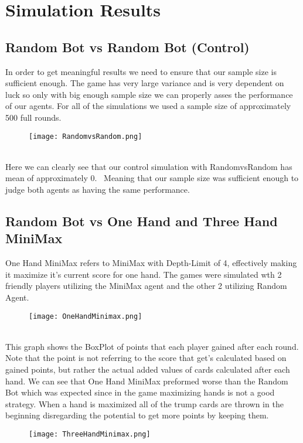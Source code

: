 \section{Simulation Results}\label{SimulationResults}
\subsection{Random Bot vs Random Bot (Control)}
In order to get meaningful results we need to ensure that our sample size is sufficient enough. 
The game has very large variance and is very dependent on luck so only with big enough sample size we can properly asses the performance of our agents.
For all of the simulations we used a sample size of approximately 500 full rounds. 
\begin{figure}[h]
    \centering
    \texttt{[image: RandomvsRandom.png]}
\end{figure}\\
Here we can clearly see that our control simulation with RandomvsRandom has mean of approximately 0. \
Meaning that our sample size was sufficient enough to judge both agents as having the same performance.
\pagebreak
\subsection{Random Bot vs One Hand and Three Hand MiniMax}
One Hand MiniMax refers to MiniMax with Depth-Limit of 4, effectively making it maximize it's current score for one hand. 
The games were simulated wth 2 friendly players utilizing the MiniMax agent and the other 2 utilizing Random Agent.
\begin{figure}[h]
    \centering
    \texttt{[image: OneHandMinimax.png]}
\end{figure}\\
This graph shows the BoxPlot of points that each player gained after each round. 
Note that the point is not referring to the score that get's calculated based on gained points, but rather the actual added values of cards calculated after each hand.
We can see that One Hand MiniMax preformed worse than the Random Bot which was expected since in the game maximizing hands is not a good strategy. 
When a hand is maximized all of the trump cards are thrown in the beginning disregarding the potential to get more points by keeping them. 
\begin{figure}[h]
    \centering
    \texttt{[image: ThreeHandMinimax.png]}
\end{figure}\\
\pagebreak

